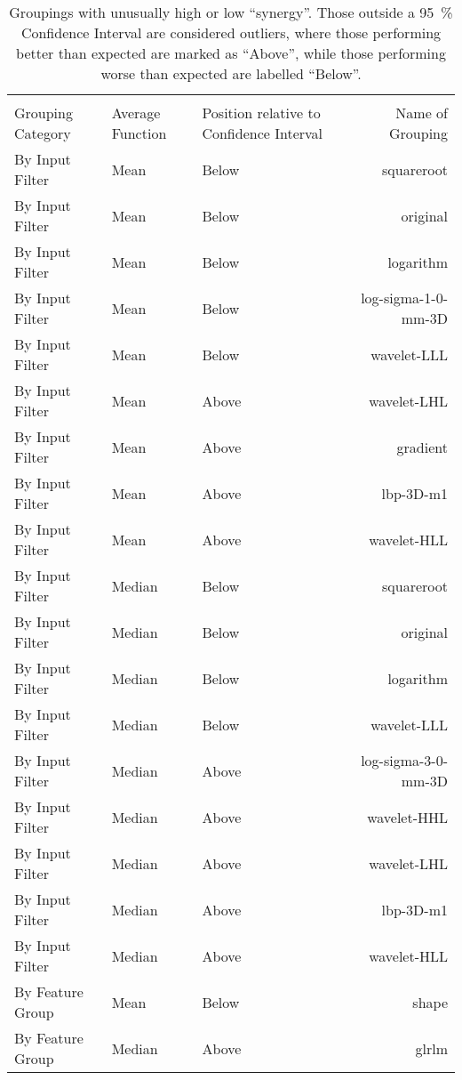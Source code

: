 {\tiny
\begin{xltabular}{\textwidth}{X l l r}
    \caption{Groupings with unusually high or low \enquote{synergy}. Those outside a \SI{95}{\percent} Confidence Interval are considered outliers, where those performing better than expected are marked as \enquote{Above}, while those performing worse than expected are labelled \enquote{Below}.}\label{tbl:outliers}\endlastfoot\\
Grouping Category & Average Function & Position relative to Confidence Interval & Name of Grouping \\\hline\endhead
By Input Filter & Mean & Below & squareroot \\
By Input Filter & Mean & Below & original \\
By Input Filter & Mean & Below & logarithm \\
By Input Filter & Mean & Below & log-sigma-1-0-mm-3D \\
By Input Filter & Mean & Below & wavelet-LLL \\

By Input Filter & Mean & Above & wavelet-LHL \\
By Input Filter & Mean & Above & gradient \\
By Input Filter & Mean & Above & lbp-3D-m1 \\
By Input Filter & Mean & Above & wavelet-HLL \\

By Input Filter & Median & Below & squareroot \\
By Input Filter & Median & Below & original \\
By Input Filter & Median & Below & logarithm \\
By Input Filter & Median & Below & wavelet-LLL \\

By Input Filter & Median & Above & log-sigma-3-0-mm-3D \\
By Input Filter & Median & Above & wavelet-HHL \\
By Input Filter & Median & Above & wavelet-LHL \\
By Input Filter & Median & Above & lbp-3D-m1 \\
By Input Filter & Median & Above & wavelet-HLL \\

By Feature Group & Mean & Below & shape \\

By Feature Group & Median & Above & glrlm \\


\end{xltabular}}

